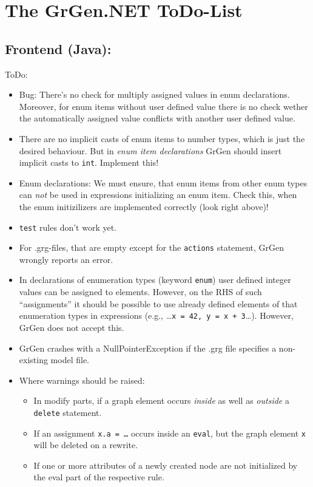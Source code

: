 \documentclass[12pt,a4paper]{article}
\begin{document}
\section*{\LARGE The GrGen.NET ToDo-List}



\subsection*{Frontend (Java):}
ToDo:
\begin{itemize}
	\item Bug: There's no check for multiply assigned values in enum declarations.
		Moreover, for enum items without user defined value there is no check wether the automatically assigned value conflicts with another user defined value.
	\item There are no implicit casts of enum items to number types, which is just the desired behaviour. But in \emph{enum item declarations} GrGen should insert implicit casts to {\tt int}. Implement this!
	\item Enum declarations: We must ensure, that enum items from other enum types can \emph{not} be used in expressions initializing an enum item.
		Check this, when the enum initizilizers are implemented correctly (look right above)!
    \item {\tt test} rules don't work yet.
	\item For .grg-files, that are empty except for the {\tt actions} statement, GrGen wrongly reports an error.
	\item In declarations of enumeration types (keyword {\tt enum}) user defined integer values can be assigned to elements.
	  However, on the RHS of such "`assignments"' it should be possible to use already defined elements of that enumeration types in expressions (e.g., \dots{}{\tt{}x = 42, y = x + 3}\dots). However, GrGen does not accept this.
    \item GrGen crashes with a NullPointerException if the .grg file specifies a non-existing model file.
	\item Where warnings should be raised:
		\begin{itemize}
			\item In modify parts, if a graph element occurs \emph{inside} as well as \emph{outside} a {\tt delete} statement.
			\item If an assignment {\tt x.a = \dots} occurs inside an {\tt eval}, but the graph element {\tt x} will be deleted on a rewrite.
			\item If one or more attributes of a newly created node are not initialized by the eval part of the respective rule.

\end{itemize}
\end{itemize}
\end{document}
